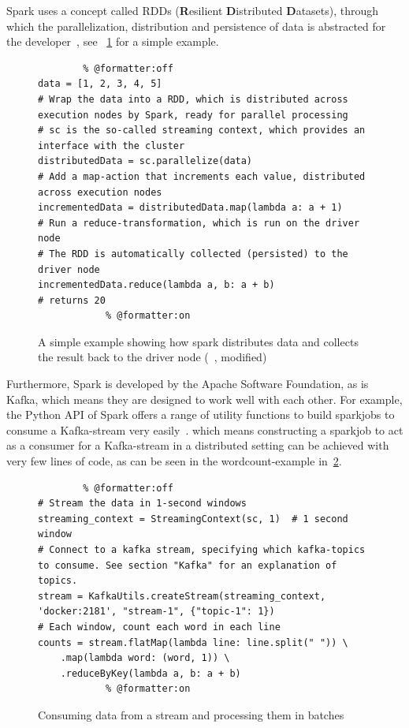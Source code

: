 \par
Spark uses a concept called RDDs
(\textbf{R}esilient \textbf{D}istributed \textbf{D}atasets),
through which the parallelization, distribution and persistence of data is abstracted for the developer~\cite{sparkDocs}, see ~\ref{code:simpleParallelization} for a simple example.

\begin{figure}
    \caption{A simple example showing how spark distributes data and collects the result back to the driver node (~\cite{sparkDocs}, modified)}
    \label{code:simpleParallelization}
    \begin{verbatim}
        % @formatter:off
data = [1, 2, 3, 4, 5]
# Wrap the data into a RDD, which is distributed across execution nodes by Spark, ready for parallel processing
# sc is the so-called streaming context, which provides an interface with the cluster
distributedData = sc.parallelize(data)
# Add a map-action that increments each value, distributed across execution nodes
incrementedData = distributedData.map(lambda a: a + 1)
# Run a reduce-transformation, which is run on the driver node
# The RDD is automatically collected (persisted) to the driver node
incrementedData.reduce(lambda a, b: a + b)
# returns 20
            % @formatter:on
    \end{verbatim}
\end{figure}

Furthermore, Spark is developed by the Apache Software Foundation, as is Kafka,
which means they are designed to work well with each other.
For example, the Python API of Spark offers a range of utility functions to build sparkjobs to consume a Kafka-stream very easily~\cite{sparkDocs}.
which means constructing a sparkjob to act as a consumer for a Kafka-stream in a distributed setting can be achieved with very few lines of code,
as can be seen in the wordcount-example in~\ref{code:wordcount}.

\begin{figure}
    \caption{Consuming data from a stream and processing them in batches}
    \label{code:wordcount}
    \begin{verbatim}
        % @formatter:off
# Stream the data in 1-second windows
streaming_context = StreamingContext(sc, 1)  # 1 second window
# Connect to a kafka stream, specifying which kafka-topics to consume. See section "Kafka" for an explanation of topics.
stream = KafkaUtils.createStream(streaming_context, 'docker:2181', "stream-1", {"topic-1": 1})
# Each window, count each word in each line
counts = stream.flatMap(lambda line: line.split(" ")) \
    .map(lambda word: (word, 1)) \
    .reduceByKey(lambda a, b: a + b)
            % @formatter:on
    \end{verbatim}
\end{figure}

